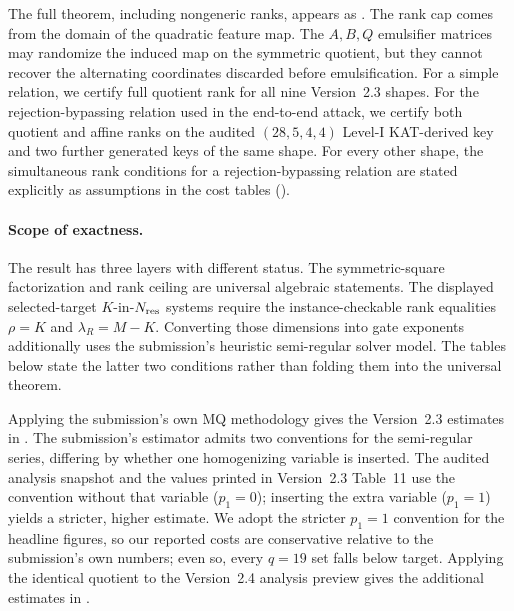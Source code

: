 \documentclass[11pt]{article}
\begin{document}
The full theorem, including nongeneric ranks, appears as .  The rank cap comes from the domain of the quadratic feature map.  The $A,B,Q$ emulsifier matrices may randomize the induced map on the symmetric quotient, but they cannot recover the alternating coordinates discarded before emulsification.  For a simple relation, we certify full quotient rank for all nine Version~2.3 shapes.  For the rejection-bypassing relation used in the end-to-end attack, we certify both quotient and affine ranks on the audited $(28,5,4,4)$ Level-I KAT-derived key and two further generated keys of the same shape.  For every other shape, the simultaneous rank conditions for a rejection-bypassing relation are stated explicitly as assumptions in the cost tables ().

\paragraph{Scope of exactness.}
The result has three layers with different status.  The symmetric-square factorization and rank ceiling are universal algebraic statements.  The displayed selected-target $K$-in-$N_{\rm res}$ systems require the instance-checkable rank equalities $\rho=K$ and $\lambda_R=M-K$.  Converting those dimensions into gate exponents additionally uses the submission's heuristic semi-regular solver model.  The tables below state the latter two conditions rather than folding them into the universal theorem.

Applying the submission's own MQ methodology gives the Version~2.3 estimates in .  The submission's estimator admits two conventions for the semi-regular series, differing by whether one homogenizing variable is inserted.  The audited analysis snapshot and the values printed in Version~2.3 Table~11 use the convention without that variable ($p_1=0$); inserting the extra variable ($p_1=1$) yields a stricter, higher estimate.  We adopt the stricter $p_1=1$ convention for the headline figures, so our reported costs are conservative relative to the submission's own numbers; even so, every $q=19$ set falls below target.  Applying the identical quotient to the Version~2.4 analysis preview gives the additional estimates in .
\end{document}
